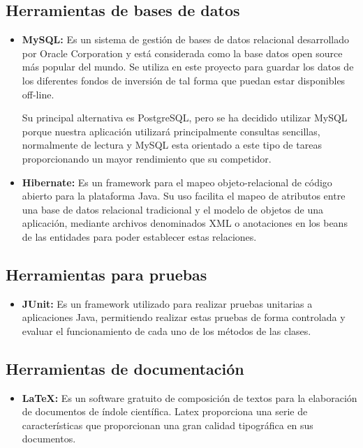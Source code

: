 \documentclass[12pt, a4paper]{article}
\begin{document}
\subsection{Herramientas de bases de datos}

\begin{itemize}
	\item \textbf{MySQL: }Es un sistema de gestión de bases de datos relacional desarrollado por Oracle Corporation y está considerada como la base datos open source más popular del mundo. Se utiliza en este proyecto para guardar los datos de los diferentes fondos de inversión de tal forma que puedan estar disponibles off-line.
	
	\vspace{2mm}
	
	Su principal alternativa es PostgreSQL, pero se ha decidido utilizar MySQL porque nuestra aplicación utilizará principalmente consultas sencillas, normalmente de lectura y MySQL esta orientado a este tipo de tareas proporcionando un mayor rendimiento que su competidor.\\  
	
	\item \textbf{Hibernate: }Es un framework para el mapeo objeto-relacional de código abierto para la plataforma Java. Su uso facilita el mapeo de atributos entre una base de datos relacional tradicional y el modelo de objetos de una aplicación, mediante archivos denominados \gls{XML} o anotaciones en los beans de las entidades para poder establecer estas relaciones.
\end{itemize}	
	
\subsection{Herramientas para pruebas}
\begin{itemize}
	\item \textbf{JUnit: }Es un framework utilizado para realizar pruebas unitarias a aplicaciones Java, permitiendo realizar estas pruebas de forma controlada y evaluar el funcionamiento de cada uno de los métodos de las clases.
\end{itemize}

\subsection{Herramientas de documentación}

	\begin{itemize}
		\item \textbf{LaTeX: }Es un software gratuito de composición de textos para la elaboración de documentos de índole científica. Latex proporciona una serie de características que proporcionan una gran calidad tipográfica en sus documentos.
	\end{itemize}
	
\end{document}

